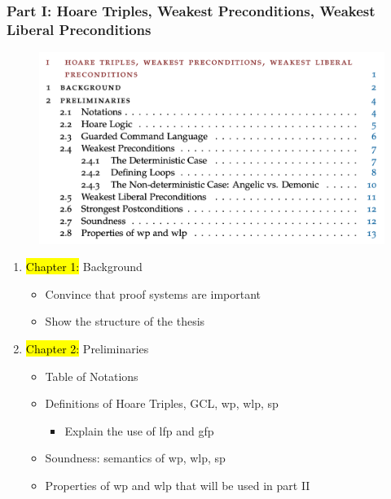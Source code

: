 \documentclass[aspectratio=169]{beamer}
\begin{document}
\begin{frame}[fragile]
	\frametitle{Part I: Hoare Triples, Weakest Preconditions, Weakest Liberal
Preconditions}
	\begin{minipage}[t]{0.49\linewidth}	
		\begin{figure}
			\centering \includegraphics[width=1.1\textwidth]{images/part1.png} 
	  \end{figure}
	\end{minipage}
	\begin{minipage}[t]{0.5\linewidth}
		\begin{enumerate}
			\item[] \hl{Chapter 1: }Background 
			\begin{itemize}
				\item Convince that proof systems are important
				\item Show the structure of the thesis
			\end{itemize}
			\item[] \hl{Chapter 2: }Preliminaries
			\begin{itemize}
				\item Table of Notations 
				\item Definitions of Hoare Triples, GCL, wp, wlp, sp
				\begin{itemize}
					\item Explain the use of lfp and gfp
				\end{itemize}
				\item Soundness: semantics of wp, wlp, sp
				\item Properties of wp and wlp that will be used in part II 
			\end{itemize}
		\end{enumerate}
	\end{minipage}
\end{frame}
\end{document}
